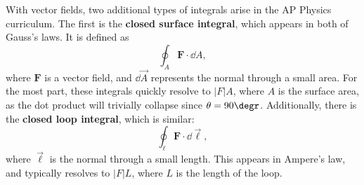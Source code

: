 \documentclass[11pt]{article}
\begin{document}
With vector fields, two additional types of integrals arise in the AP Physics curriculum. The first is the \textbf{closed surface integral}, which appears in both of Gauss's laws. It is defined as
\begin{equation}
    \oint_A \mathbf{F} \cdot \dd A,
\end{equation}
where $\mathbf{F}$ is a vector field, and $\dd \vec{A}$ represents the normal through a small area. For the most part, these integrals quickly resolve to $|F|A$, where $A$ is the surface area, as the dot product will trivially collapse since $\theta = 90\degr$. Additionally, there is the \textbf{closed loop integral}, which is similar:
\begin{equation}
    \oint_{\ell} \mathbf{F} \cdot \dd\vec{\ell},
\end{equation}
where $\vec{\ell}$ is the normal through a small length. This appears in Ampere's law, and typically resolves to $|F|L$, where $L$ is the length of the loop.
\end{document}
